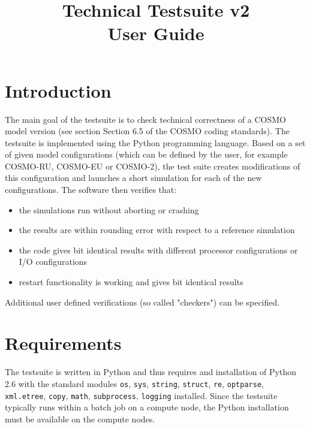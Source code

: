 \documentclass[12pt,twoside,a4paper]{report}
\title{Technical Testsuite v2 \\User Guide}
\begin{document}
\maketitle
\setcounter{tocdepth}{1}
\tableofcontents 

\section{Introduction}

The main goal of the testsuite is to check technical correctness of a COSMO model version (see section Section 6.5 of the COSMO coding standards). The testsuite is implemented using the Python programming language.
Based on a set of given model configurations (which can be defined by the user, for example COSMO-RU, COSMO-EU or COSMO-2), the test suite creates modifications of this configuration and launches a short simulation for each of the new configurations. The software then verifies that:
\begin{itemize}
\item the simulations run without aborting or crashing
\item the results are within rounding error with respect to a reference simulation
\item the code gives bit identical results with different processor configurations or I/O configurations
\item restart functionality is working and gives bit identical results
\end{itemize}

Additional user defined verifications (so called "checkers") can be specified.

\section{Requirements}

The testsuite is written in Python and thus requires and installation of Python 2.6 with the standard modules \texttt{os}, \texttt{sys}, \texttt{string}, \texttt{struct}, \texttt{re}, \texttt{optparse}, \texttt{xml.etree}, \texttt{copy}, \texttt{math}, \texttt{subprocess}, \texttt{logging} installed. Since the testsuite typically runs within a batch job on a compute node, the Python installation must be available on the compute nodes.

\end{document}
